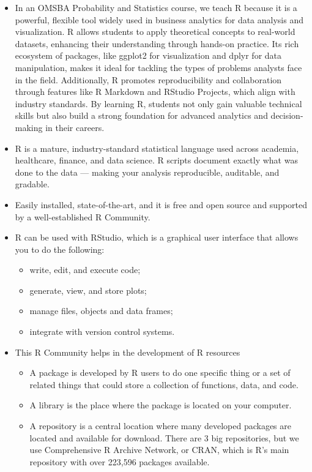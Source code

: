 \documentclass[
  letterpaper,
  DIV=11,
  numbers=noendperiod]{scrreprt}
\providecommand{\tightlist}{%
  \setlength{\itemsep}{0pt}\setlength{\parskip}{0pt}}\usepackage{longtable,booktabs,array}
\begin{document}
\begin{itemize}
\item
  In an OMSBA Probability and Statistics course, we teach R because it
  is a powerful, flexible tool widely used in business analytics for
  data analysis and visualization. R allows students to apply
  theoretical concepts to real-world datasets, enhancing their
  understanding through hands-on practice. Its rich ecosystem of
  packages, like ggplot2 for visualization and dplyr for data
  manipulation, makes it ideal for tackling the types of problems
  analysts face in the field. Additionally, R promotes reproducibility
  and collaboration through features like R Markdown and RStudio
  Projects, which align with industry standards. By learning R, students
  not only gain valuable technical skills but also build a strong
  foundation for advanced analytics and decision-making in their
  careers.
\item
  R is a mature, industry-standard statistical language used across
  academia, healthcare, finance, and data science. R scripts document
  exactly what was done to the data --- making your analysis
  reproducible, auditable, and gradable.
\item
  Easily installed, state-of-the-art, and it is free and open source and
  supported by a well-established R Community.
\item
  R can be used with RStudio, which is a graphical user interface that
  allows you to do the following:

  \begin{itemize}
  \tightlist
  \item
    write, edit, and execute code;
  \item
    generate, view, and store plots;
  \item
    manage files, objects and data frames;
  \item
    integrate with version control systems.
  \end{itemize}
\item
  This R Community helps in the development of R resources

  \begin{itemize}
  \tightlist
  \item
    A package is developed by R users to do one specific thing or a set
    of related things that could store a collection of functions, data,
    and code.
  \item
    A library is the place where the package is located on your
    computer.
  \item
    A repository is a central location where many developed packages are
    located and available for download. There are 3 big repositories,
    but we use Comprehensive R Archive Network, or CRAN, which is R's
    main repository with over 223,596 packages available.
  \end{itemize}
\end{itemize}
\end{document}
